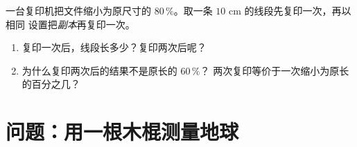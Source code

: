 \begin{exercise}[$\star\star\star$]\label{exo:g7:prop:11}
一台复印机把文件缩小为原尺寸的 $80\,\%$。取一条
$10$ cm 的线段先复印一次，再以相同
设置把\emph{副本}再复印一次。
\begin{enumerate}
  \item 复印一次后，线段长多少？复印两次后呢？
  \item 为什么复印两次后的结果不是原长的 $60\,\%$？
        两次复印等价于一次缩小为原长的百分之几？
\end{enumerate}
\end{exercise}

\section{问题：用一根木棍测量地球}

